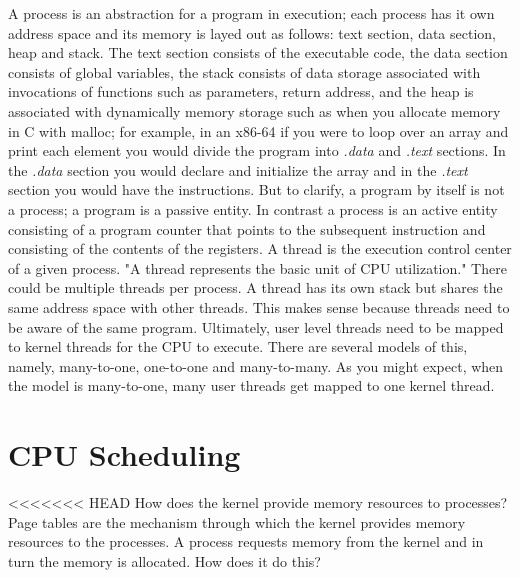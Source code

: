 \documentclass{amsbook}
\begin{document}
A process is an abstraction for a program in execution; each process has it own address space and its memory is layed out as follows: text section, data section, heap and stack. The text section consists of the executable code, the data section consists of global variables, the stack consists of data storage associated with invocations of functions such as parameters, return address, and the heap is associated with dynamically memory storage such as when you allocate memory in C with malloc; for example, in an x86-64 if you were to loop over an array and print each element you would divide the program into \textit{.data} and \textit{.text} sections. In the \textit{.data} section you would declare and initialize the array and in the \textit{.text} section you would have the instructions. But to clarify, a program by itself is not a process; a program is a passive entity. In contrast a process is an active entity consisting of a program counter that points to the subsequent instruction and consisting of the contents of the registers. A thread is the execution control center of a given process. "A thread represents the basic unit of CPU utilization." There could be multiple threads per process. A thread has its own stack but shares the same address space with other threads. This makes sense because threads need to be aware of the same program. Ultimately, user level threads need to be mapped to kernel threads for the CPU to execute. There are several models of this, namely, many-to-one, one-to-one and many-to-many. As you might expect, when the model is many-to-one, many user threads get mapped to one kernel thread.

\section{CPU Scheduling}

<<<<<<< HEAD
How does the kernel provide memory resources to processes? Page tables are the mechanism through which the kernel provides memory resources to the processes. A process requests memory from the kernel and in turn the memory is allocated. How does it do this? 
\end{document}
